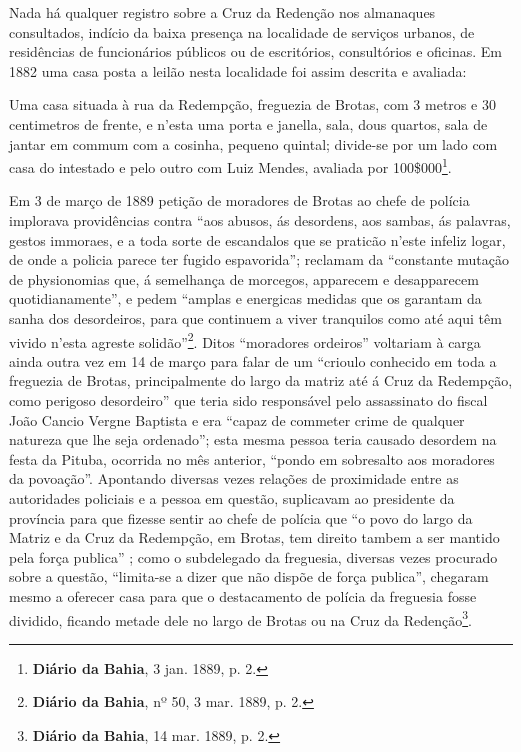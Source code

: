 Nada há qualquer registro sobre a Cruz da Redenção nos almanaques consultados, indício da baixa presença na localidade de serviços urbanos, de residências de funcionários públicos ou de escritórios, consultórios e oficinas. Em 1882 uma casa posta a leilão nesta localidade foi assim descrita e avaliada:

\begin{citacao}
Uma casa situada à rua da Redempção, freguezia de Brotas, com 3 metros e 30 centimetros de frente, e n'esta uma porta e janella, sala, dous quartos, sala de jantar em commum com a cosinha, pequeno quintal; divide-se por um lado com casa do intestado e pelo outro com Luiz Mendes, avaliada por 100\$000\footnote{\textbf{Diário da Bahia}, 3 jan. 1889, p. 2.}.
\end{citacao}

Em 3 de março de 1889 petição de moradores de Brotas ao chefe de polícia implorava providências contra ``aos abusos, ás desordens, aos sambas, ás palavras, gestos immoraes, e a toda sorte de escandalos que se praticão n'este infeliz logar, de onde a policia parece ter fugido espavorida''; reclamam da ``constante mutação de physionomias que, á semelhança de morcegos, apparecem e desapparecem quotidianamente'', e pedem ``amplas e energicas medidas que os garantam da sanha dos desordeiros, para que continuem a viver tranquilos como até aqui têm vivido n'esta agreste solidão''\footnote{\textbf{Diário da Bahia}, nº 50, 3 mar. 1889, p. 2.}. Ditos ``moradores ordeiros'' voltariam à carga ainda outra vez em 14 de março para falar de um ``crioulo conhecido em toda a freguezia de Brotas, principalmente do largo da matriz até á Cruz da Redempção, como perigoso desordeiro'' que teria sido responsável pelo assassinato do fiscal João Cancio Vergne Baptista e era ``capaz de commeter crime de qualquer natureza que lhe seja ordenado''; esta mesma pessoa teria causado desordem na festa da Pituba, ocorrida no mês anterior, ``pondo em sobresalto aos moradores da povoação''. Apontando diversas vezes relações de proximidade entre as autoridades policiais e a pessoa em questão, suplicavam ao presidente da província para que fizesse sentir ao chefe de polícia que ``o povo do largo da Matriz e da Cruz da Redempção, em Brotas, tem direito tambem a ser mantido pela força publica'' ; como o subdelegado da freguesia, diversas vezes procurado sobre a questão, ``limita-se a dizer que não dispõe de força publica'', chegaram mesmo a oferecer casa para que o destacamento de polícia da freguesia fosse dividido, ficando metade dele no largo de Brotas ou na Cruz da Redenção\footnote{\textbf{Diário da Bahia}, 14 mar. 1889, p. 2.}.

